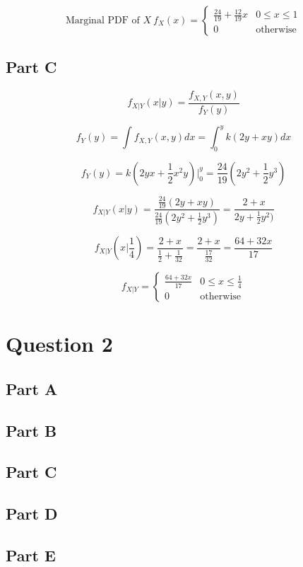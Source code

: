 \documentclass[letterpaper]{article}
\begin{document}
$$\text{Marginal PDF of } X \ f_X(x) = \begin{cases} \frac{24}{19} + \frac{12}{19} x & 0 \leq x \leq 1 \\ 0 & \text{otherwise} \end{cases}$$

\subsection*{Part C}

$$f_{X|Y} (x|y) = \frac{f_{X,Y}(x,y)}{f_Y(y)}$$

$$f_Y(y) = \int f_{X, Y}(x, y) dx = \int_0^y k(2y + xy) dx$$

$$f_Y(y) = k(2yx + \frac{1}{2} x^2y) \Big|_0^y = \frac{24}{19} (2y^2 + \frac{1}{2} y^3)$$

$$f_{X|Y} (x|y) = \frac{\frac{24}{19}(2y + xy)}{\frac{24}{19} (2y^2 + \frac{1}{2} y^3)} = \frac{2 + x}{2y + \frac{1}{2} y^2)}$$

$$f_{X|Y} (x|\frac{1}{4}) = \frac{2 + x}{\frac{1}{2} + \frac{1}{32}} = \frac{2 + x}{\frac{17}{32}} = \frac{64 + 32x}{17}$$

$$f_{X|Y} = \begin{cases} \frac{64 + 32x}{17} & 0 \leq x \leq \frac{1}{4} \\ 0 & \text{otherwise} \end{cases}$$

\section*{Question 2}

\subsection*{Part A}

\subsection*{Part B}

\subsection*{Part C}

\subsection*{Part D}

\subsection*{Part E}
\end{document}
